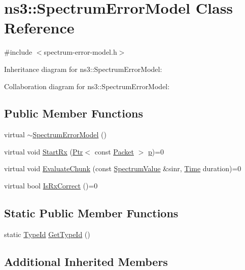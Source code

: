 \hypertarget{classns3_1_1SpectrumErrorModel}{}\section{ns3\+:\+:Spectrum\+Error\+Model Class Reference}
\label{classns3_1_1SpectrumErrorModel}


{\ttfamily \#include $<$spectrum-\/error-\/model.\+h$>$}



Inheritance diagram for ns3\+:\+:Spectrum\+Error\+Model\+:


Collaboration diagram for ns3\+:\+:Spectrum\+Error\+Model\+:
\subsection*{Public Member Functions}
\begin{DoxyCompactItemize}
\item 
virtual \hyperlink{classns3_1_1SpectrumErrorModel_a0f15b0b72fe69bc647f8adf79c7ed989}{$\sim$\+Spectrum\+Error\+Model} ()
\item 
virtual void \hyperlink{classns3_1_1SpectrumErrorModel_a49aad41fa0c38b66c6ca094bcce5dee7}{Start\+Rx} (\hyperlink{classns3_1_1Ptr}{Ptr}$<$ const \hyperlink{classns3_1_1Packet}{Packet} $>$ \hyperlink{lte__link__budget__x2__handover__measures_8m_ac9de518908a968428863f829398a4e62}{p})=0
\item 
virtual void \hyperlink{classns3_1_1SpectrumErrorModel_ae067d4343114dadc13bc4570f1aeb588}{Evaluate\+Chunk} (const \hyperlink{classns3_1_1SpectrumValue}{Spectrum\+Value} \&sinr, \hyperlink{classns3_1_1Time}{Time} duration)=0
\item 
virtual bool \hyperlink{classns3_1_1SpectrumErrorModel_a8a553ca7b47fc83507c8d56423473329}{Is\+Rx\+Correct} ()=0
\end{DoxyCompactItemize}
\subsection*{Static Public Member Functions}
\begin{DoxyCompactItemize}
\item 
static \hyperlink{classns3_1_1TypeId}{Type\+Id} \hyperlink{classns3_1_1SpectrumErrorModel_a6d27aea103c5ebd3cf374e4521376b9b}{Get\+Type\+Id} ()
\end{DoxyCompactItemize}
\subsection*{Additional Inherited Members}


